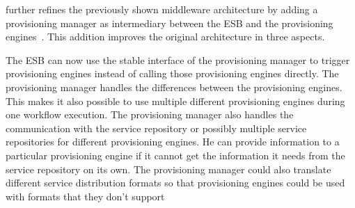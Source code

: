 \citeauthor{provisioning:dynamic} further refines the previously shown middleware architecture by adding a provisioning manager as intermediary between the ESB and the provisioning engines~\autocite{provisioning:dynamic}.
This addition improves the original architecture in three aspects.

The ESB can now use the stable interface of the provisioning manager to trigger provisioning engines instead of calling those provisioning engines directly.
The provisioning manager handles the differences between the provisioning engines.
This makes it also possible to use multiple different provisioning engines during one workflow execution.
The provisioning manager also handles the communication with the service repository or possibly multiple service repositories for different provisioning engines.
He can provide information to a particular provisioning engine if it cannot get the information it needs from the service repository on its own.
The provisioning manager could also translate different service distribution formats so that provisioning engines could be used with formats that they don't support
